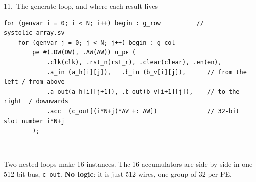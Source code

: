\documentclass[aspectratio=169,11pt]{beamer}
\newcommand{\sig}[1]{\texttt{#1}}
\begin{document}
\begin{frame}[fragile]{11.\ The generate loop, and where each result lives}
\begin{lstlisting}
for (genvar i = 0; i < N; i++) begin : g_row          // systolic_array.sv
    for (genvar j = 0; j < N; j++) begin : g_col
        pe #(.DW(DW), .AW(AW)) u_pe (
            .clk(clk), .rst_n(rst_n), .clear(clear), .en(en),
            .a_in (a_h[i][j]),   .b_in (b_v[i][j]),      // from the left / from above
            .a_out(a_h[i][j+1]), .b_out(b_v[i+1][j]),    // to the right  / downwards
            .acc  (c_out[(i*N+j)*AW +: AW])              // 32-bit slot number i*N+j
        );
\end{lstlisting}
  \centering
  \\[1mm]
  \raggedright\small
  Two nested loops make 16 instances. The 16 accumulators are side by side in one 512-bit bus,
  \sig{c\_out}. \textbf{No logic}: it is just 512 wires, one group of 32 per PE.
\end{frame}

\end{document}
